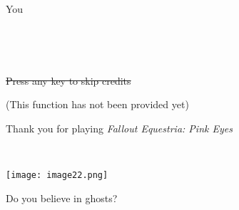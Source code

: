 \begin{center}

    \Large You

\end{center}

~\vfill


\clearpage

~\vfill

\begin{center}

    \sout{Press any key to skip credits}
    
    (This function has not been provided yet)

    \vspace{\baselineskip}

    Thank you for playing \emph{Fallout Equestria: Pink Eyes}

\end{center}

~\vfill

\texttt{[image: image22.png]}

\begin{motto}
    Do you believe in ghosts?
\end{motto}

